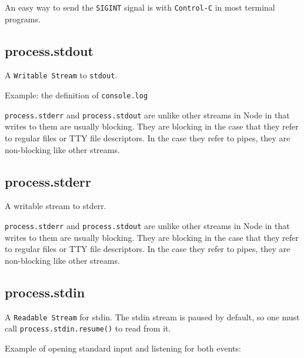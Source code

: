 An easy way to send the \texttt{SIGINT} signal is with
\texttt{Control-C} in most terminal programs.

\subsection{process.stdout}

A \texttt{Writable Stream} to \texttt{stdout}.

Example: the definition of \texttt{console.log}

\begin{Shaded}
\begin{Highlighting}[]
 \NormalTok{= }
  \NormalTok{);}
\NormalTok{\};}
\end{Highlighting}
\end{Shaded}

\texttt{process.stderr} and \texttt{process.stdout} are unlike other
streams in Node in that writes to them are usually blocking. They are
blocking in the case that they refer to regular files or TTY file
descriptors. In the case they refer to pipes, they are non-blocking like
other streams.

\subsection{process.stderr}

A writable stream to stderr.

\texttt{process.stderr} and \texttt{process.stdout} are unlike other
streams in Node in that writes to them are usually blocking. They are
blocking in the case that they refer to regular files or TTY file
descriptors. In the case they refer to pipes, they are non-blocking like
other streams.

\subsection{process.stdin}

A \texttt{Readable Stream} for stdin. The stdin stream is paused by
default, so one must call \texttt{process.stdin.resume()} to read from
it.

Example of opening standard input and listening for both events:

